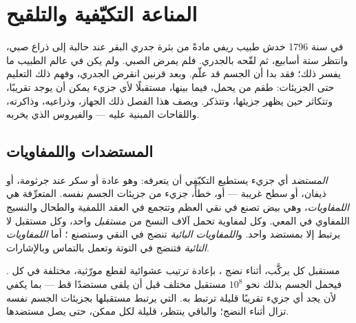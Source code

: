 \chapter{المناعة التكيّفية والتلقيح}\label{ch:g12:adaptive-immunity}

في سنة 1796 خدش طبيب ريفي مادةً من بثرة جدري البقر عند حالبة إلى ذراع
صبي، وانتظر ستة أسابيع، ثم لقّحه بالجدري. فلم يمرض الصبي. ولم يكن في
عالم الطبيب ما يفسر ذلك؛ فقد بدا أن الجسم قد علّم. وبعد قرنين انقرض
الجدري، وفهم ذلك التعليم حتى الجزيئات: طقم من  يحمل، فيما
بينها، مستقبلًا لأي جزيء يمكن أن يوجد تقريبًا، وتتكاثر حين يظهر
جزيئها، وتتذكر. ويصف هذا الفصل ذلك الجهاز، وذراعيه، وذاكرته، واللقاحات
المبنية عليه --- والفيروس الذي يخربه.

\section{المستضدات واللمفاويات}

\begin{definition}\label{def:g12:adaptive-immunity:antigen}
\emph{المستضد} أي جزيء يستطيع  التكيّفي أن
يتعرفه: وهو عادة  أو سكر عند جرثومة، أو ذيفان، أو سطح 
غريبة --- أو، خطأً، جزيء من جزيئات الجسم نفسه.  المتعرِّفة هي
\emph{اللمفاويات}، وهي  بيض تصنع في نقي العظم
وتتجمع في العقد اللمفية والطحال والنسيج اللمفاوي في المعي. وكل لمفاوية
تحمل آلاف النسخ من \emph{مستقبل} واحد، وكل مستقبل لا يرتبط إلا بمستضد
واحد. و\emph{اللمفاويات البائية} تنضج في النقي وستصنع ؛
أما \emph{اللمفاويات التائية} فتنضج في التوتة وتعمل بالتماس
وبالإشارات.
\end{definition}

\begin{proposition}\label{prop:g12:adaptive-immunity:repertoire}
مستقبل كل  يركَّب، أثناء نضج ، بإعادة ترتيب عشوائية لقطع
مورّثية، مختلفة في كل . فيحمل الجسم بذلك نحو $10^{8}$ مستقبل مختلف
قبل أن يلقى مستضدًا قط --- بما يكفي لأن يجد أي جزيء تقريبًا  قليلة
ترتبط به.  التي يرتبط مستقبلها بجزيئات الجسم نفسه تزال
أثناء النضج؛ والباقي ينتظر،  قليلة لكل  ممكن، حتى يصل
مستضدها.
\end{proposition}
\admitted

